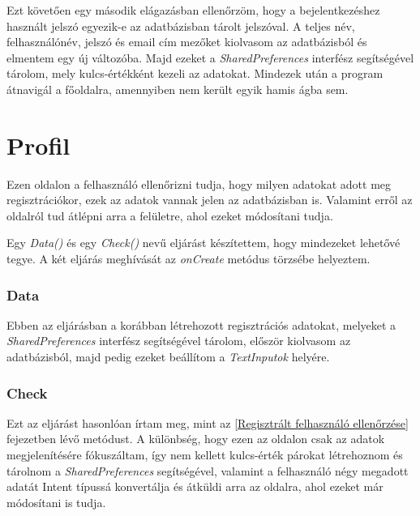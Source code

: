 \documentclass{thesis-ekf}
\begin{document}
Ezt követően egy második elágazásban ellenőrzöm, hogy a bejelentkezéshez használt jelszó egyezik-e az adatbázisban tárolt jelszóval. A teljes név, felhasználónév, jelszó és email cím mezőket kiolvasom az adatbázisból és elmentem egy új változóba. Majd ezeket a \textit{SharedPreferences} interfész segítségével tárolom, mely kulcs-értékként kezeli az adatokat. Mindezek után a program átnavigál a főoldalra, amennyiben nem került egyik hamis ágba sem.

\renewcommand{\lstlistingname}{kód}


\section{Profil}
Ezen oldalon a felhasználó ellenőrizni tudja, hogy milyen adatokat adott meg regisztrációkor, ezek az adatok vannak jelen az adatbázisban is. Valamint erről az oldalról tud átlépni arra a felületre, ahol ezeket módosítani tudja.

Egy \textit{Data()} és egy \textit{Check()} nevű eljárást készítettem, hogy mindezeket lehetővé tegye. A két eljárás meghívását az \textit{onCreate} metódus törzsébe helyeztem.

\subsubsection{Data}
Ebben az eljárásban a korábban létrehozott regisztrációs adatokat, melyeket a \textit{SharedPreferences} interfész segítségével tárolom, először kiolvasom az adatbázisból, majd pedig ezeket beállítom a \textit{TextInputok} helyére. 

\subsubsection{Check}
Ezt az eljárást hasonlóan írtam meg, mint az \ref{Regisztrált felhasználó ellenőrzése} fejezetben lévő metódust. A különbség, hogy ezen az oldalon csak az adatok megjelenítésére fókuszáltam, így nem kellett kulcs-érték párokat létrehoznom és tárolnom a \textit{SharedPreferences} segítségével, valamint a felhasználó négy megadott adatát Intent típussá konvertálja és átküldi arra az oldalra, ahol ezeket már módosítani is tudja.
\end{document}
